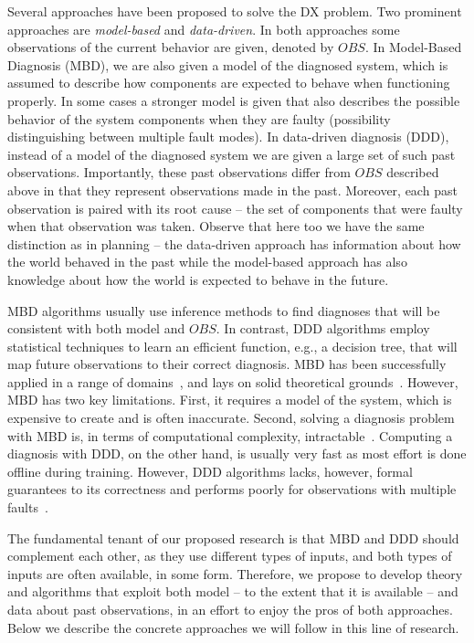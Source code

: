 \documentclass[12pt]{article}
\begin{document}
Several approaches have been proposed to solve the DX problem. Two prominent approaches are {\em model-based} and {\em data-driven}. In both approaches some observations of the current behavior are given, denoted by $OBS$. In Model-Based Diagnosis (MBD), we are also given a model of the diagnosed system, which is assumed to describe how  components are expected to behave when functioning properly. In some cases a stronger model is given that also describes the possible behavior of the system components when they are faulty (possibility distinguishing between multiple fault modes). In data-driven diagnosis (DDD), instead of a model of the diagnosed system we are given a large set of such past observations. Importantly, these past observations differ from $OBS$ described above in that they represent observations made in the past. Moreover, each past observation is paired with its root cause -- the set of components that were faulty when that observation was taken. Observe that here too we have the same distinction as in planning -- the data-driven approach has information about how the world behaved in the past while the model-based approach has also knowledge about how the world is expected to behave in the future. 


MBD algorithms usually use inference methods to find diagnoses that will be consistent with both model and $OBS$. In contrast, DDD algorithms employ statistical techniques to learn an efficient function, e.g., a decision tree, that will map future observations to their correct diagnosis. 
MBD has been successfully applied in a range of domains~\cite{williams96,struss2003model,wotawa2002model}, and lays on solid theoretical grounds~\cite{de1987diagnosing,reiter1987theory}. However, MBD has two key limitations. First, it requires a model of the system, which is expensive to create and is often inaccurate. Second, solving a diagnosis problem with MBD is, in terms of computational complexity, intractable~\cite{bylander1991computational}. Computing a diagnosis with DDD, on the other hand, is usually very fast as most effort is done offline during training. However, DDD algorithms lacks, however, formal guarantees to its correctness and performs poorly for observations with multiple faults~\cite{keren2011model}. 



The fundamental tenant of our proposed research is that MBD and DDD should complement each other, as they use different types of inputs, and both types of inputs are often available, in some form. Therefore, we propose to develop theory and algorithms that exploit both model -- to the extent that it is available -- and data about past observations, in an effort to enjoy the pros of both approaches. Below we describe the concrete approaches we will follow in this line of research.
\end{document}
